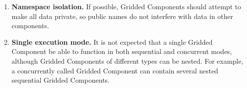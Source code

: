 %


\begin{enumerate}

\item {\bf Namespace isolation.}
If possible, Gridded Components should attempt to make 
all data private, so public names do not interfere with data 
in other components.

\item {\bf Single execution mode.}
It is not expected that a single Gridded Component be able 
to function in both sequential and concurrent modes, although 
Gridded Components of different types can be nested. For example,
a concurrently called Gridded Component can contain several nested 
sequential Gridded Components. 

\end{enumerate}
